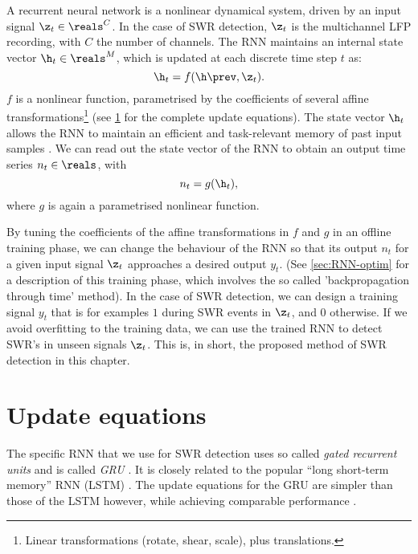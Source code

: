 A recurrent neural network is a nonlinear dynamical system, driven by an input signal $\z_t \in \reals^C$. In the case of SWR detection, $\z_t$ is the multichannel LFP recording, with $C$ the number of channels. The RNN maintains an internal state vector $\h_t \in \reals^M$, which is updated at each discrete time step $t$ as:
%
\begin{equation}
\label{eq:RNN_f}
\h_t = f(\h\prev, \z_t).
\end{equation}
%
$f$ is a nonlinear function, parametrised by the coefficients of several affine transformations\footnote{Linear transformations (rotate, shear, scale), plus translations.} (see \cref{sec:GRU_eqs} for the complete update equations). The state vector $\h_t$ allows the RNN to maintain an efficient and task-relevant memory of past input samples \cite{LeCun2015}.\footnotemark{} We can read out the state vector of the RNN to obtain an output time series $n_t \in \reals$, with
%
\begin{equation}
\label{eq:RNN_g}
n_t = g(\h_t),
\end{equation}
%
where $g$ is again a parametrised nonlinear function.


By tuning the coefficients of the affine transformations in $f$ and $g$ in an offline training phase, we can change the behaviour of the RNN so that its output $n_t$ for a given input signal $\z_t$ approaches a desired output $y_t$. (See \cref{sec:RNN-optim} for a description of this training phase, which involves the so called 'backpropagation through time' method). In the case of SWR detection, we can design a training signal $y_t$ that is for examples $1$ during SWR events in $\z_t$, and $0$ otherwise. If we avoid overfitting to the training data, we can use the trained RNN to detect SWR's in unseen signals $\z_t$. This is, in short, the proposed method of SWR detection in this chapter.



\section{Update equations}
\label{sec:GRU_eqs}

The specific RNN that we use for SWR detection uses so called \emph{gated recurrent units} and is called \emph{GRU} \cite{Cho2014}. It is closely related to the popular ``long short-term memory'' RNN (LSTM) \cite{Hochreiter1997,Greff2017}. The update equations for the GRU are simpler than those of the LSTM however, while achieving comparable performance \cite{Chung2014}.

